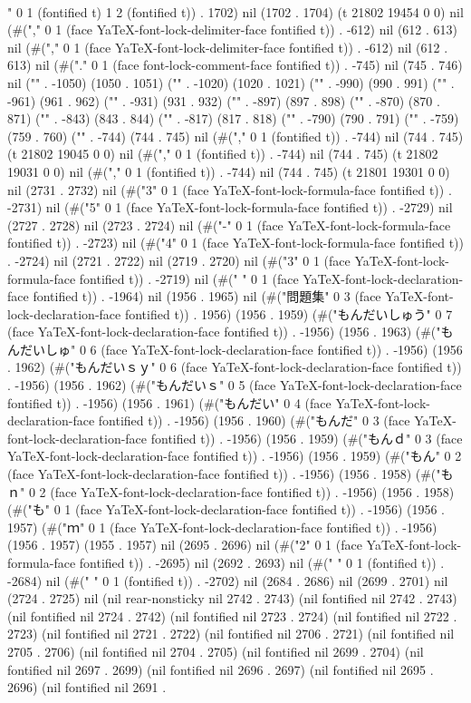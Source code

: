 \\" 0 1 (fontified t) 1 2 (fontified t)) . 1702) nil (1702 . 1704) (t 21802 19454 0 0) nil (#("," 0 1 (face YaTeX-font-lock-delimiter-face fontified t)) . -612) nil (612 . 613) nil (#("," 0 1 (face YaTeX-font-lock-delimiter-face fontified t)) . -612) nil (612 . 613) nil (#("." 0 1 (face font-lock-comment-face fontified t)) . -745) nil (745 . 746) nil ("" . -1050) (1050 . 1051) ("" . -1020) (1020 . 1021) ("" . -990) (990 . 991) ("" . -961) (961 . 962) ("" . -931) (931 . 932) ("" . -897) (897 . 898) ("" . -870) (870 . 871) ("" . -843) (843 . 844) ("" . -817) (817 . 818) ("" . -790) (790 . 791) ("" . -759) (759 . 760) ("" . -744) (744 . 745) nil (#("," 0 1 (fontified t)) . -744) nil (744 . 745) (t 21802 19045 0 0) nil (#("," 0 1 (fontified t)) . -744) nil (744 . 745) (t 21802 19031 0 0) nil (#("," 0 1 (fontified t)) . -744) nil (744 . 745) (t 21801 19301 0 0) nil (2731 . 2732) nil (#("3" 0 1 (face YaTeX-font-lock-formula-face fontified t)) . -2731) nil (#("5" 0 1 (face YaTeX-font-lock-formula-face fontified t)) . -2729) nil (2727 . 2728) nil (2723 . 2724) nil (#("-" 0 1 (face YaTeX-font-lock-formula-face fontified t)) . -2723) nil (#("4" 0 1 (face YaTeX-font-lock-formula-face fontified t)) . -2724) nil (2721 . 2722) nil (2719 . 2720) nil (#("3" 0 1 (face YaTeX-font-lock-formula-face fontified t)) . -2719) nil (#(" " 0 1 (face YaTeX-font-lock-declaration-face fontified t)) . -1964) nil (1956 . 1965) nil (#("問題集" 0 3 (face YaTeX-font-lock-declaration-face fontified t)) . 1956) (1956 . 1959) (#("もんだいしゅう" 0 7 (face YaTeX-font-lock-declaration-face fontified t)) . -1956) (1956 . 1963) (#("もんだいしゅ" 0 6 (face YaTeX-font-lock-declaration-face fontified t)) . -1956) (1956 . 1962) (#("もんだいｓｙ" 0 6 (face YaTeX-font-lock-declaration-face fontified t)) . -1956) (1956 . 1962) (#("もんだいｓ" 0 5 (face YaTeX-font-lock-declaration-face fontified t)) . -1956) (1956 . 1961) (#("もんだい" 0 4 (face YaTeX-font-lock-declaration-face fontified t)) . -1956) (1956 . 1960) (#("もんだ" 0 3 (face YaTeX-font-lock-declaration-face fontified t)) . -1956) (1956 . 1959) (#("もんｄ" 0 3 (face YaTeX-font-lock-declaration-face fontified t)) . -1956) (1956 . 1959) (#("もん" 0 2 (face YaTeX-font-lock-declaration-face fontified t)) . -1956) (1956 . 1958) (#("もｎ" 0 2 (face YaTeX-font-lock-declaration-face fontified t)) . -1956) (1956 . 1958) (#("も" 0 1 (face YaTeX-font-lock-declaration-face fontified t)) . -1956) (1956 . 1957) (#("ｍ" 0 1 (face YaTeX-font-lock-declaration-face fontified t)) . -1956) (1956 . 1957) (1955 . 1957) nil (2695 . 2696) nil (#("2" 0 1 (face YaTeX-font-lock-formula-face fontified t)) . -2695) nil (2692 . 2693) nil (#(" " 0 1 (fontified t)) . -2684) nil (#(" " 0 1 (fontified t)) . -2702) nil (2684 . 2686) nil (2699 . 2701) nil (2724 . 2725) nil (nil rear-nonsticky nil 2742 . 2743) (nil fontified nil 2742 . 2743) (nil fontified nil 2724 . 2742) (nil fontified nil 2723 . 2724) (nil fontified nil 2722 . 2723) (nil fontified nil 2721 . 2722) (nil fontified nil 2706 . 2721) (nil fontified nil 2705 . 2706) (nil fontified nil 2704 . 2705) (nil fontified nil 2699 . 2704) (nil fontified nil 2697 . 2699) (nil fontified nil 2696 . 2697) (nil fontified nil 2695 . 2696) (nil fontified nil 2691 . 